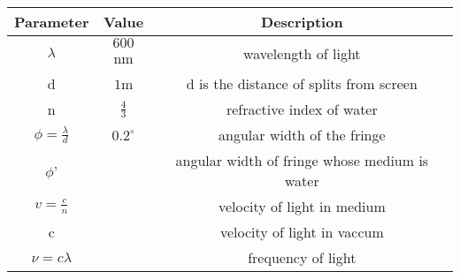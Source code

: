 \begin{tabular}{|c|c|c|}
   \hline
   \textbf{Parameter} & \textbf{Value}& \textbf{Description} \\
   \hline
        $ \lambda$ & $600$nm & wavelength of light\\
        \hline
        d & $1$m & d is the distance of splits from screen\\
        \hline
        n & $\frac{4}{3} $  & refractive index of water\\
        \hline
        $\phi=\frac{\lambda}{d}$ & $0.2^\circ$ &angular width of the fringe  \\
        \hline
        $\phi$' & &angular width of fringe whose medium is water\\
        \hline
        $v=\frac{c}{n}$& &velocity of light in medium\\
        \hline
        c& &velocity of light in vaccum\\
        \hline
        $\nu=c\lambda$& &frequency of light\\
        \hline
\end{tabular}
